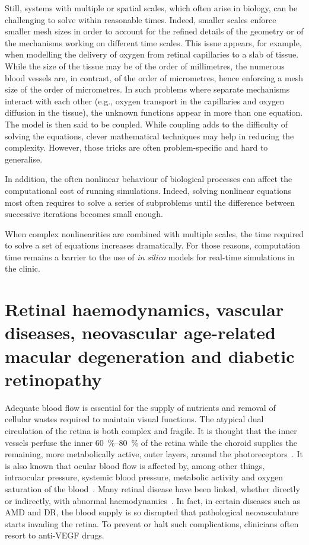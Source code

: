 \documentclass{article}
\begin{document}
Still, systems with multiple or spatial scales, which often arise in biology, can be challenging to solve within reasonable times.
Indeed, smaller scales enforce smaller mesh sizes in order to account for the refined details of the geometry or of the mechanisms working on different time scales.
This issue appears, for example, when modelling the delivery of oxygen from retinal capillaries to a slab of tissue.
While the size of the tissue may be of the order of millimetres, the numerous blood vessels are, in contrast, of the order of micrometres, hence enforcing a mesh size of the order of micrometres.
In such problems where separate mechanisms interact with each other (e.g., oxygen transport in the capillaries and oxygen diffusion in the tissue), the unknown functions appear in more than one equation.
The model is then said to be coupled.
While coupling adds to the difficulty of solving the equations, clever mathematical techniques may help in reducing the complexity.
However, those tricks are often problem-specific and hard to generalise.

In addition, the often nonlinear behaviour of biological processes can affect the computational cost of running simulations.
Indeed, solving nonlinear equations most often requires to solve a series of subproblems until the difference between successive iterations becomes small enough.

When complex nonlinearities are combined with multiple scales, the time required to solve a set of equations increases dramatically.
For those reasons, computation time remains a barrier to the use of \textit{in silico} models for real-time simulations in the clinic.






\section{Retinal haemodynamics, vascular diseases, neovascular age-related macular degeneration and diabetic retinopathy}\label{sec:RetinalHaemodynamicsNAMDDR}

Adequate blood flow is essential for the supply of nutrients and removal of cellular wastes required to maintain visual functions.
The atypical dual circulation of the retina is both complex and fragile.
It is thought that the inner vessels perfuse the inner \SIrange{60}{80}{\percent} of the retina while the choroid supplies the remaining, more metabolically active, outer layers, around the photoreceptors~\cite{Birol_2007}.
It is also known that ocular blood flow is affected by, among other things, intraocular pressure, systemic blood pressure, metabolic activity and oxygen saturation of the blood~\cite{Birol_2007,McCullough_1997,Palkovits_2014,Polska_2007,Pournaras_2008,Riva_1997,Wang_2014}.
Many retinal disease have been linked, whether directly or indirectly, with abnormal haemodynamics~\cite{Hayreh_2004,Medina_2016}.
In fact, in certain diseases such as AMD and DR, the blood supply is so disrupted that pathological neovasculature starts invading the retina.
To prevent or halt such complications, clinicians often resort to anti-VEGF drugs.
\end{document}
